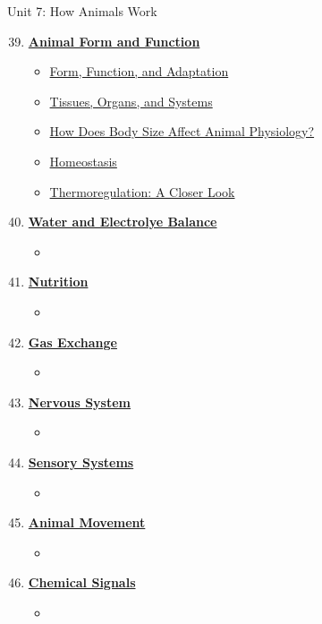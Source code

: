 \documentclass[12pt,letterpaper]{article}
\begin{document}
\begin{chapbox}{Unit 7: How Animals Work}{ 
\begin{enumerate}[font=\bfseries, wide]
    \setcounter{enumi}{38}
\item \hyperlink{39}{\textbf{Animal Form and Function}}
    \begin{itemize}
        \item \hyperlink{39.1}{Form, Function, and Adaptation}
        \item \hyperlink{39.2}{Tissues, Organs, and Systems}
        \item \hyperlink{39.3}{How Does Body Size Affect Animal Physiology?}
        \item \hyperlink{39.4}{Homeostasis}
        \item \hyperlink{39.5}{Thermoregulation: A Closer Look}
    \end{itemize}
\item \hyperlink{40}{\textbf{Water and Electrolye Balance}}
    \begin{itemize}
        \item
    \end{itemize}
\item \hyperlink{41}{\textbf{Nutrition}}
    \begin{itemize}
        \item 
    \end{itemize}
\item \hyperlink{42}{\textbf{Gas Exchange}}
    \begin{itemize}
        \item 
    \end{itemize}
\item \hyperlink{43}{\textbf{Nervous System}}
    \begin{itemize}
        \item 
    \end{itemize}
\item \hyperlink{44}{\textbf{Sensory Systems}}
    \begin{itemize}
        \item 
    \end{itemize}
\item \hyperlink{45}{\textbf{Animal Movement}}
    \begin{itemize}
        \item 
    \end{itemize}
\item \hyperlink{46}{\textbf{Chemical Signals}}
    \begin{itemize}
        \item 
    \end{itemize}
\end{enumerate}
}\end{chapbox}
\end{document}
